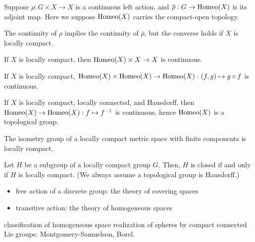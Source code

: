 \documentclass{../../large}
\begin{document}
\begin{prb}
Suppose $\rho:G\times X\to X$ is a continuous left action, and $\overline\rho:G\to\operatorname{Homeo}(X)$ is its adjoint map.
Here we suppose $\operatorname{Homeo}(X)$ carries the compact-open topology.
\begin{parts}
\item The continuity of $\rho$ implies the continuity of $\bar\rho$, but the converse holds if $X$ is locally compact.
\item If $X$ is locally compact, then $\operatorname{Homeo}(X)\times X\to X$ is continuous.
\item If $X$ is locally compact, $\operatorname{Homeo}(X)\times\operatorname{Homeo}(X)\to\operatorname{Homeo}(X):(f,g)\mapsto g\circ f$ is continuous.
\item If $X$ is locally compact, locally connected, and Hausdorff, then $\operatorname{Homeo}(X)\to\operatorname{Homeo}(X):f\mapsto f^{-1}$ is continuous, hence $\operatorname{Homeo}(X)$ is a topological group.
\end{parts}
\end{prb}


The isometry group of a locally compact metric space with finite components is locally compact.


\begin{prb}
Let $H$ be a subgroup of a locally compact group $G$.
Then, $H$ is closed if and only if $H$ is locally compact.
(We always assume a topological group is Hausdorff.)
\end{prb}

\begin{itemize}
\item free action of a discrete group: the theory of covering spaces
\item transitive action: the theory of homogeneous spaces
\end{itemize}

classification of homogeneous space realization of spheres by compact connected Lie groups: Montgomery-Samuelson, Borel.





\begin{prb}
\end{prb}




\chapter{}
\end{document}

